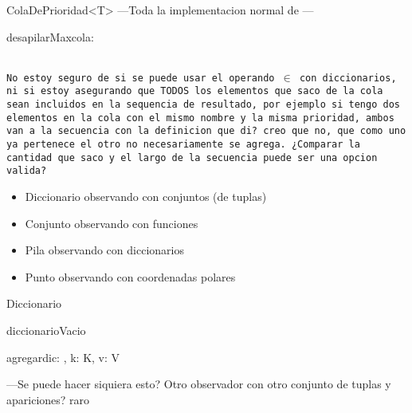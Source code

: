\documentclass[10pt,a4paper]{article}
\begin{document}
\begin{tad}{ColaDePrioridad\textless T\textgreater}
    ---Toda la implementacion normal de \nt ---
    \begin{proc}{desapilarMax}{\Inout cola:\nt}{}
        {\color{red}}
    \end{proc}
\end{tad}
\\\texttt{\color{red}No estoy seguro de si se puede usar el operando $\in$ con diccionarios, ni si estoy asegurando que TODOS los 
elementos que saco de la cola sean incluidos en la sequencia de resultado, por ejemplo si tengo dos elementos en la cola con el 
mismo nombre y la misma prioridad, ambos van a la secuencia con la definicion que di? creo que no, que como uno ya pertenece el otro 
no necesariamente se agrega. ¿Comparar la cantidad que saco y el largo de la secuencia puede ser una opcion valida?}
\begin{itemize}
    \item Diccionario observando con conjuntos (de tuplas)
    \item Conjunto observando con funciones
    \item Pila observando con diccionarios
    \item Punto observando con coordenadas polares
\end{itemize}
\pagebreak
\begin{tad}{Diccionario}
    \begin{proc}{diccionarioVacio}{}{\nt}
    \end{proc}
    \begin{proc}{agregar}{\Inout dic: \nt, \In k: K, \In v: V}{}
    \end{proc}
    {\color{red}---Se puede hacer siquiera esto? Otro observador con otro conjunto de tuplas
     y apariciones? raro}
\end{tad}
\end{document}
